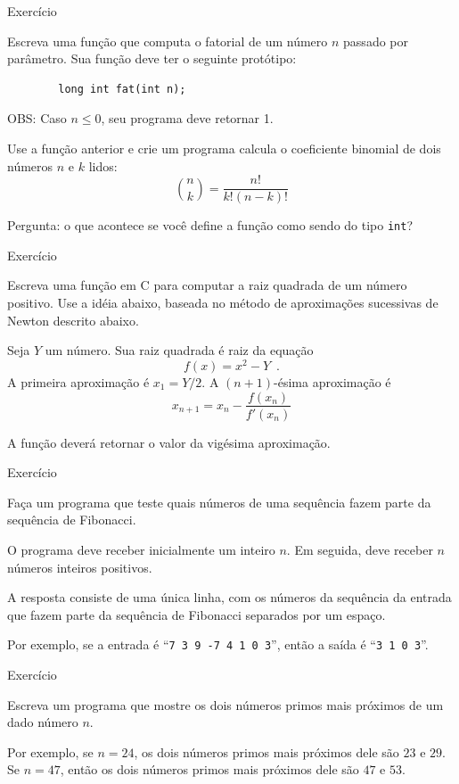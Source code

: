 \documentclass[handout]{beamer}
\newcommand{\cod}[1]{\texttt{#1}}
\begin{document}
\begin{frame}[fragile]{Exercício}

    Escreva uma função que computa o fatorial de um número $n$ passado por parâmetro.
    Sua função deve ter o seguinte protótipo:

    \begin{verbatim}
        long int fat(int n);
    \end{verbatim}
    OBS: Caso $n \leq 0$, seu programa deve retornar 1.

    Use a função anterior e crie um programa calcula o coeficiente binomial de dois números $n$ e $k$ lidos:
    $${n \choose k} = \frac{n!}{k! (n-k)!}$$

    \alert{Pergunta: o que acontece se você define a função como sendo do tipo \cod{int}?}
\end{frame}

\begin{frame}[fragile]{Exercício} 

    Escreva uma função em C para computar a raiz quadrada de um número positivo.
    Use a idéia abaixo, baseada no método de aproximações sucessivas de Newton descrito abaixo.

    Seja $Y$ um número. Sua raiz quadrada é raiz da equação $$f(x) = x^2 - Y \enspace .$$
    A primeira aproximação é $x_1 = Y/2$.
    A $(n+1)$-ésima aproximação é
    $$x_{n+1} = x_n -  \frac{f(x_n)}{f'(x_n)}$$

    A função deverá retornar o valor da vigésima aproximação.
\end{frame}

\begin{frame}[fragile]{Exercício}
    
    Faça um programa que teste quais números de uma sequência fazem parte da sequência de Fibonacci.

    O programa deve receber inicialmente um inteiro $n$. Em seguida, deve receber $n$ números inteiros positivos.

    A resposta consiste de uma única linha, com os números da sequência da entrada que fazem parte da sequência de Fibonacci separados por um espaço.

    Por exemplo, se a entrada é ``\texttt{7 3 9 -7 4 1 0 3}'', então a saída é ``\texttt{3 1 0 3}''.
\end{frame}

\begin{frame}[fragile]{Exercício}
    
    Escreva um programa que mostre os dois números primos mais próximos de um dado número $n$.
    
    Por exemplo, se $n = 24$, os dois números primos mais próximos dele são $23$ e $29$.
    Se $n = 47$, então os dois números primos mais próximos dele são $47$ e $53$.
\end{frame}
\end{document}
